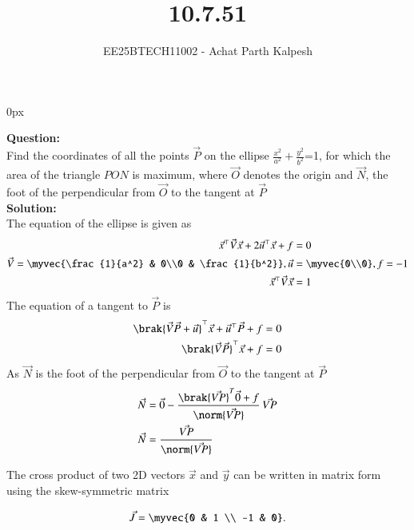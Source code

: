 \documentclass[journal]{IEEEtran}
\begin{document}

\title{10.7.51}
\author{EE25BTECH11002 - Achat Parth Kalpesh }
{\let\newpage\relax\maketitle}
\renewcommand{\thefigure}{\theenumi}
\renewcommand{\thetable}{\theenumi}
\setlength{\intextsep}{10pt} %
\renewcommand{\thetable}{\theenumi}
\parindent 0px



\textbf{Question:}\\
Find the coordinates of all the points $\vec{P}$ on the ellipse $\frac{x^2}{a^2}+\frac{y^2}{b^2}$=1, for which the area of the triangle $PON$ is maximum, where $\vec{O}$ denotes the origin and $\vec{N}$, the foot of the perpendicular from $\vec{O}$ to the tangent at $\vec{P}$\\
\textbf{Solution:}\\
The equation of the ellipse is given as
\begin{align}
\vec{x}^\top\vec{V}\vec{x} + 2\vec{u}^\top\vec{x} + f &= 0\\
\vec{V} = \myvec{\frac{1}{a^2} & 0\\0 & \frac{1}{b^2}},\vec{u} &= \myvec{0\\0} , f = -1\\
\vec{x}^\top\vec{V} \vec{x} &= 1
\end{align}
The equation of a tangent to $\vec{P}$ is 
\begin{align}
    \brak{\vec{V}\vec{P} + \vec{u}}^\top \vec{x} + \vec{u}^\top\vec{P} + f = 0\\
    \brak{\vec{V}\vec{P}}^\top\vec{x} + f = 0
\end{align}
As $\vec{N}$ is the foot of the perpendicular from $\vec{O}$ to the tangent at $\vec{P}$
    \begin{align}
    \vec{N} &= \vec{0} - \frac{\brak{\vec{VP}}^T \vec{0} + f}{\norm{\vec{VP}}} \, \vec{VP}\\
    \vec{N} &= \frac{\vec{VP}}{\norm{\vec{VP}}}
\end{align} 


The cross product of two 2D vectors $\vec{x}$ and 
$\vec{y}$  can be written in matrix form using the skew-symmetric matrix

\begin{align}
    \vec{J} = \myvec{0 & 1 \\ -1 & 0}.
\end{align}
\end{document}
